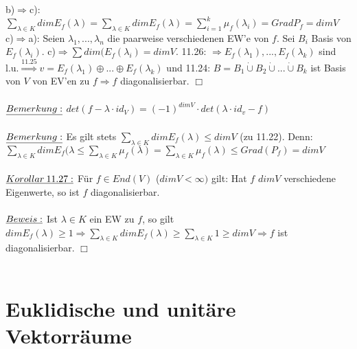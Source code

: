 \documentclass[fleqn, a4paper, 11pt]{scrartcl}
\theoremstyle{definition}
\begin{document}
b)$\Rightarrow$c): $\sum\limits_{\lambda\in K} dim E_f(\lambda)=\sum\limits_{\lambda\in K} dim E_f(\lambda)=\sum\limits_{i=1}^k \mu_f(\lambda_i)=Grad P_f=dim V$\\
c)$\Rightarrow$a): Seien $\lambda_1,...,\lambda_n$ die paarweise verschiedenen EW'e von $f$. Sei $B_i$ Basis von $E_f(\lambda_i)$. c)$\Rightarrow\sum dim(E_f(\lambda_i)=dim V$. 11.26: $\Rightarrow E_f(\lambda_1),...,E_f(\lambda_k)$ sind l.u.$\stackrel{11.25}{\Rightarrow} v=E_f(\lambda_1)\oplus...\oplus E_f(\lambda_k)$ und 11.24: $B=B_1\mathbin{\dot{\cup}}B_2\mathbin{\dot{\cup}}...\mathbin{\dot{\cup}}B_k$ ist Basis von $V$ von EV'en zu $f\Rightarrow f$ diagonalisierbar. \hfill $\Box$\\
\\
$\uline{Bemerkung:}$ $det(f-\lambda\cdot id_V)=(-1)^{dim V}\cdot det(\lambda\cdot id_v -f)$\\
\\
$\uline{Bemerkung:}$ Es gilt stets $\sum\limits_{\lambda\in K} dim E_f(\lambda)\leq dim V$ (zu 11.22). Denn: $\sum\limits_{\lambda\in K}dim E_f(\lambda\leq \sum\limits_{\lambda\in K}\mu_f(\lambda)=\sum\limits_{\lambda\in K}\mu_f(\lambda)\leq Grad(P_f)=dim V$\\
\\
$\uline{Korollar\:11.27:}$ Für $f\in End(V)$ ($dim V<\infty)$ gilt: Hat $f$ $dim V$ verschiedene Eigenwerte, so ist $f$ diagonalisierbar.\\
\\
$\uline{Beweis:}$ Ist $\lambda\in K$ ein EW zu $f$, so gilt $dim E_f(\lambda)\geq 1\Rightarrow \sum\limits_{\lambda\in K} dim E_f(\lambda)\geq\sum\limits_{\lambda\in K} 1\geq dim V\Rightarrow f$ ist diagonalisierbar. \hfill $\Box$\\
\\
\newpage
\section{Euklidische und unitäre Vektorräume}
\end{document}
